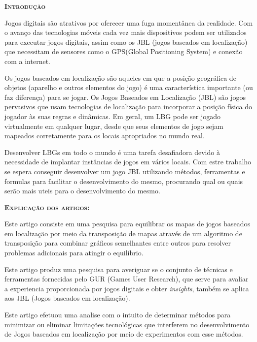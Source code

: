 \documentclass[12pt,a4paper]{article}
\author{Ítalo César Alves de Oliveira}
\begin{document}
\begin{flushleft}
\textbf{\textsc{Introdução}}
\end{flushleft}

	Jogos digitais são atrativos por oferecer uma fuga momentânea da realidade. Com o avanço das tecnologias móveis cada vez mais dispositivos podem ser utilizados para executar jogos digitais, assim como os JBL (jogos baseados em localização) que necessitam de sensores como o GPS(Global Positioning System) e conexão com a internet.
	
	Os jogos baseados em localização são aqueles em que a posição geográfica de objetos (aparelho e outros elementos do jogo) é uma característica importante (ou faz diferença) para se jogar\cite{Luis}. Os Jogos Baseados em Localização (JBL) são jogos pervasivos que usam tecnologias  de localização para incorporar a posição física do jogador às suas regras e dinâmicas\cite{Nayana}. Em geral, um LBG pode ser jogado virtualmente em qualquer lugar, desde que seus elementos de jogo sejam mapeados corretamente para os locais apropriados no mundo real\cite{Maia}.
	
	Desenvolver LBGs em todo o mundo é uma tarefa desafiadora devido à necessidade de implantar instâncias de jogos em vários locais\cite{Maia}. Com estre trabalho se espera conseguir desenvolver um jogo JBL utilizando métodos, ferramentas e formulas para facilitar o desenvolvimento do mesmo, procurando qual ou quais serão mais uteis para o desenvolvimento do mesmo.
	
\begin{flushleft}
\textbf{\textsc{Explicação dos artigos:}}
\end{flushleft}

	Este artigo consiste em uma pesquisa para equilibrar os mapas de jogos baseados em localização por meio da transposição de mapas através de um algoritmo de transposição para combinar gráficos semelhantes entre outros para resolver problemas adicionais para atingir o equilíbrio\cite{Maia}.
	
	Este artigo produz uma pesquisa para averiguar se o conjunto de técnicas e ferramentas fornecidas pelo GUR (Games User Research), que serve para avaliar a experiencia proporcionada por jogos digitais e obter \textit{insights}, também se aplica aos JBL (Jogos baseados em localização)\cite{Nayana}.
	
	Este artigo efetuou uma analise com o intuito de determinar métodos para minimizar ou eliminar limitações tecnológicas que interferem no desenvolvimento de Jogos baseados em localização por meio de experimentos com esse métodos\cite{Luis}.
	
\end{document}
